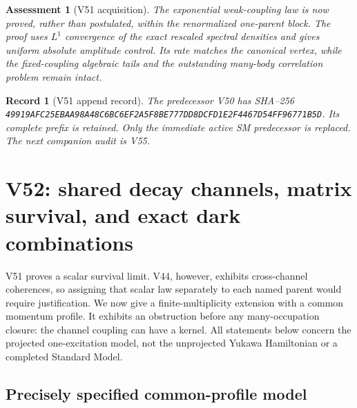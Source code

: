 \documentclass[11pt]{article}
\newtheorem{assessment}[theorem]{Assessment}
\newtheorem{record}[theorem]{Record}
\theoremstyle{remark}
\begin{document}
\begin{assessment}[V51 acquisition]
\label{ass:v20v51}
The exponential weak-coupling law is now proved, rather than
postulated, within the renormalized one-parent block.
The proof uses \(L^1\) convergence of the exact rescaled
spectral densities and gives uniform absolute amplitude
control.  Its rate matches the canonical vertex, while the
fixed-coupling algebraic tails and the outstanding many-body
correlation problem remain intact.
\end{assessment}

\begin{record}[V51 append record]
\label{rec:v20v51}
The predecessor V50 has SHA--256
\texttt{49919AFC25EBAA98A48C6BC6EF2A5F8BE777DD8DCFD1E2F4467D54FF96771B5D}.
Its complete prefix is retained.  Only the immediate active
SM predecessor is replaced.  The next companion audit is V55.
\end{record}



\section{V52: shared decay channels, matrix survival, and exact dark combinations}
\label{sec:v20v52}

V51 proves a scalar survival limit.  V44, however, exhibits
cross-channel coherences, so assigning that scalar law separately
to each named parent would require justification.  We now give a
finite-multiplicity extension with a common momentum profile.
It exhibits an obstruction before any many-occupation closure:
the channel coupling can have a kernel.  All statements below
concern the projected one-excitation model, not the unprojected
Yukawa Hamiltonian or a completed Standard Model.

\subsection{Precisely specified common-profile model}
\end{document}
